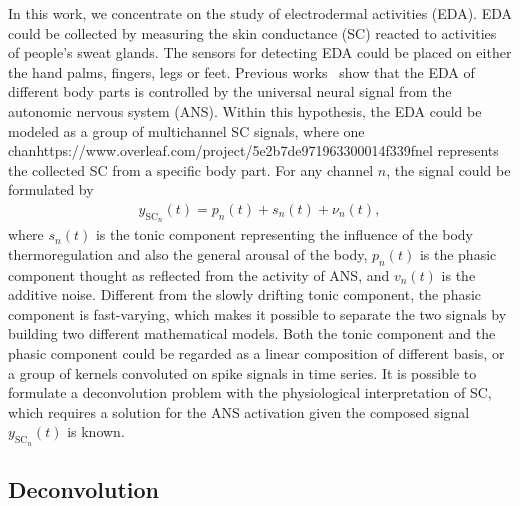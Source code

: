 \documentclass[10pt,conference]{ieeeconf}
\providecommand{\rm}[1]{\mathrm{#1}}
\begin{document}
In this work, we concentrate on the study of electrodermal activities (EDA). EDA could be collected by measuring the skin conductance (SC) reacted to activities of people's sweat glands. The sensors for detecting EDA could be placed on either the hand palms, fingers, legs or feet. Previous works~\cite{fowles1981publication,amin2019robust} show that the EDA of different body parts is controlled by the universal neural signal from the autonomic nervous system (ANS). Within this hypothesis, the EDA could be modeled as a group of multichannel SC signals, where one chanhttps://www.overleaf.com/project/5e2b7de971963300014f339fnel represents the collected SC from a specific body part. For any channel $n$, the signal could be formulated by
\begin{align} \label{fml:scmodel}
  y_{\rm{SC}_\mathit{n}}(t) = p_n(t) + s_n(t) + \nu_n(t),
\end{align}
%
where $s_n(t)$ is the tonic component representing the influence of the body thermoregulation and also the general arousal of the body, $p_n(t)$ is the phasic component thought as reflected from the activity of ANS, and $v_n(t)$ is the additive noise. Different from the slowly drifting tonic component, the phasic component is fast-varying, which makes it possible to separate the two signals by building two different mathematical models. Both the tonic component and the phasic component could be regarded as a linear composition of different basis, or a group of kernels convoluted on spike signals in time series. It is possible to formulate a deconvolution problem with the physiological interpretation of SC, which requires a solution for the ANS activation given the composed signal  $y_{\rm{SC}_n}(t)$  is known.

\subsection{Deconvolution}
\end{document}
